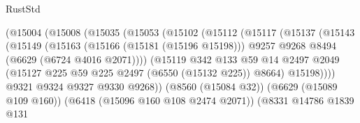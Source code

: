 \begin{lexlean}{RustStd}
\begin{coremodule}
                                    (@15004
                                      (@15008
                                        (@15035
                                          (@15053
                                            (@15102
                                              (@15112
                                                (@15117
                                                  (@15137
                                                    (@15143
                                                      (@15149
                                                        (@15163
                                                          (@15166 (@15181 (@15196 @15198)))
                                                          @9257
                                                          @9268
                                                          @8494
                                                          (@6629 (@6724 @4016 @2071))))
                                                      (@15119
                                                        @342
                                                        @133
                                                        @59
                                                        @14
                                                        @2497
                                                        @2049
                                                        (@15127
                                                          @225
                                                          @59
                                                          @225
                                                          @2497
                                                          (@6550 (@15132 @225))
                                                          @8664)
                                                        @15198))))
                                                @9321
                                                @9324
                                                @9327
                                                @9330
                                                @9268))
                                            (@8560 (@15084 @32))
                                            (@6629 (@15089 @109 @160))
                                            (@6418 (@15096 @160 @108 @2474 @2071))
                                            (@8331
                                              @14786
                                              @1839
                                              @131

\end{coremodule}
\end{lexlean}
